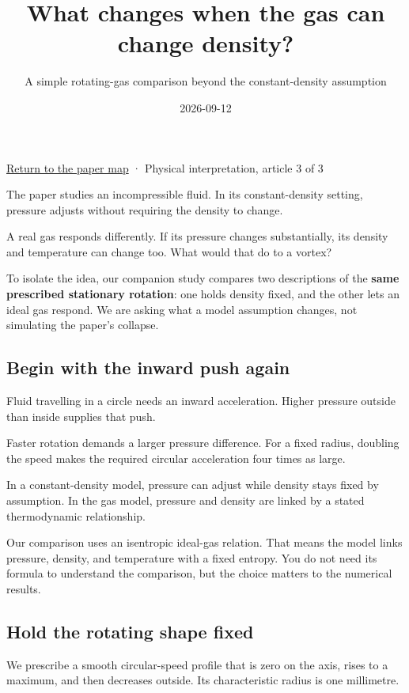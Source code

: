 \documentclass[
  english,
  11pt,
]{article}
\title{What changes when the gas can change density?}
\subtitle{A simple rotating-gas comparison beyond the constant-density
assumption}
\author{}
\date{2026-09-12}
\begin{document}
\maketitle


\href{../paper-map/article.html}{Return to the paper map} · Physical
interpretation, article 3 of 3

The paper studies an incompressible fluid. In its constant-density
setting, pressure adjusts without requiring the density to change.

A real gas responds differently. If its pressure changes substantially,
its density and temperature can change too. What would that do to a
vortex?

To isolate the idea, our companion study compares two descriptions of
the \textbf{same prescribed stationary rotation}: one holds density
fixed, and the other lets an ideal gas respond. We are asking what a
model assumption changes, not simulating the paper's collapse.

\subsection{Begin with the inward push
again}\label{begin-with-the-inward-push-again}

Fluid travelling in a circle needs an inward acceleration. Higher
pressure outside than inside supplies that push.

Faster rotation demands a larger pressure difference. For a fixed
radius, doubling the speed makes the required circular acceleration four
times as large.

In a constant-density model, pressure can adjust while density stays
fixed by assumption. In the gas model, pressure and density are linked
by a stated thermodynamic relationship.

Our comparison uses an isentropic ideal-gas relation. That means the
model links pressure, density, and temperature with a fixed entropy. You
do not need its formula to understand the comparison, but the choice
matters to the numerical results.

\subsection{Hold the rotating shape
fixed}\label{hold-the-rotating-shape-fixed}

We prescribe a smooth circular-speed profile that is zero on the axis,
rises to a maximum, and then decreases outside. Its characteristic
radius is one millimetre.
\end{document}
